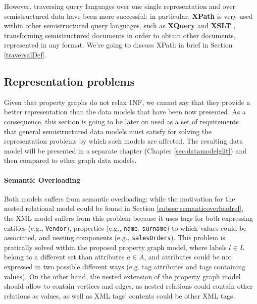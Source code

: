 However, traversing query languages over one single representation and over semistructured data have been more successful: in particular, \textbf{XPath} \cite{xpath31} is very used within other semistructured query languages, such as \textbf{XQuery} \cite{XQuery} and \textbf{XSLT} \cite{Tidwell},  transforming semistructured documents in order to obtain other documents, represented in any format. %
We're going to discuss XPath in brief in Section \vref{traversalDef}.


\subsection{Representation problems}\label{sec:semireprproblems}
Given that property graphs do not relax 1NF, we cannot say that they provide a better representation than the data models that have been now presented. As a consequence, this section is going to be later on used as a set of requirements that general semistructured data models must satisfy for solving the representation problems by which such models are affected. The resulting data model will be presented in a separate chapter (Chapter \vref{sec:datamodelglit}) and then compared to other graph data models.

\paragraph*{Semantic Overloading} Both models suffers from  semantic overloading: while the motivation for the nested relational model could be  found in Section \vref{subsec:semanticoverloadrel}, the XML model suffers from this problem because it uses tags for both expressing entities (e.g., \texttt{Vendor}), properties (e.g., \texttt{name}, \texttt{surname}) to which values could be associated, and nesting components (e.g., \texttt{salesOrders}). This problem is pratically solved within the proposed property graph model, where labels $l\in L$ belong to a different set than attributes $a\in A$, and attributes could be not expressed in two possible different ways (e.g. tag attributes and tags containing values). On the other hand, the nested extension of the property graph model should allow to contain vertices and edges, as nested relations could contain other relations as values, as well as XML tags' contents could be other XML tags.

